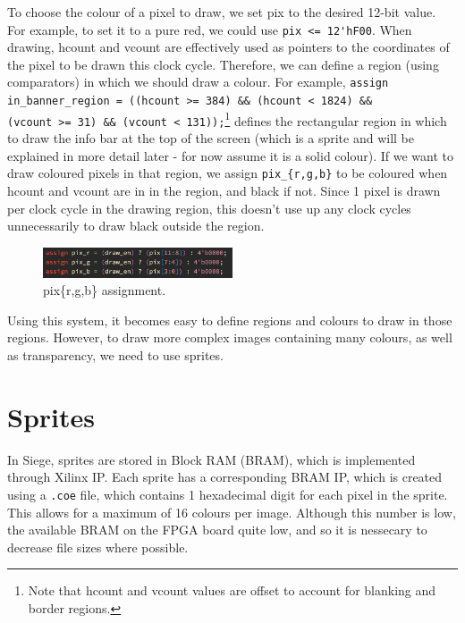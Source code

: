 \documentclass{ifda}
\begin{document}
To choose the colour of a pixel to draw, we set pix to the desired 12-bit value. For example, to set it to a pure red, we could use \verb|pix <= 12'hF00|. When drawing, hcount and vcount are effectively used as pointers to the coordinates of the pixel to be drawn this clock cycle. Therefore, we can define a region (using comparators) in which we should draw a colour. For example, \verb|assign in_banner_region = ((hcount >= 384) && (hcount < 1824) &&|\\ \verb|(vcount >= 31) && (vcount < 131));|\footnote{Note that hcount and vcount values are offset to account for blanking and border regions.} defines the rectangular region in which to draw the info bar at the top of the screen (which is a sprite and will be explained in more detail later - for now assume it is a solid colour). If we want to draw coloured pixels in that region, we assign \verb|pix_{r,g,b}| to be coloured when hcount and vcount are in in the region, and black if not. Since 1 pixel is drawn per clock cycle in the drawing region, this doesn't use up any clock cycles unnecessarily to draw black outside the region.\\

\begin{figure}[h]
    \centering
    \includegraphics[width=0.5\textwidth]{ code2 }
    \caption{pix\{r,g,b\} assignment.}
    \label{fig:sync_assignment}
\end{figure}

Using this system, it becomes easy to define regions and colours to draw in those regions. However, to draw more complex images containing many colours, as well as transparency, we need to use sprites. 

\section{Sprites}
In Siege, sprites are stored in Block RAM (BRAM), which is implemented through Xilinx IP. Each sprite has a corresponding BRAM IP, which is created using a \verb|.coe| file, which contains 1 hexadecimal digit for each pixel in the sprite. This allows for a maximum of 16 colours per image. Although this number is low, the available BRAM on the FPGA board quite low, and so it is nessecary to decrease file sizes where possible.\\
\end{document}
